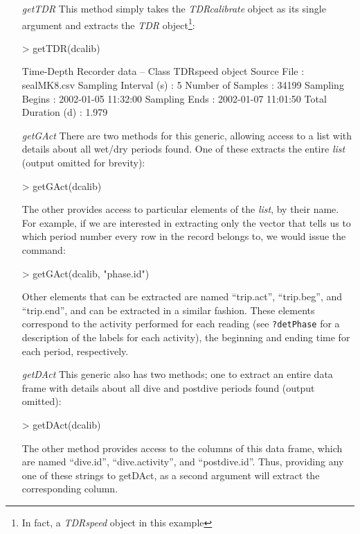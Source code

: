 \documentclass[12pt, letterpaper]{scrartcl}
\newcommand{\Rclass}[1]{{\textit{#1}}}
\newcommand{\Rmethod}[1]{{\textit{#1}}}
\begin{document}
\begin{itemize}
\item [\Rmethod{getTDR}] This method simply takes the
  \Rclass{TDRcalibrate} object as its single argument and extracts the
  \Rclass{TDR} object\footnote{In fact, a \Rclass{TDRspeed} object in this
    example}:
\begin{Schunk}
\begin{Sinput}
> getTDR(dcalib)
\end{Sinput}
\begin{Soutput}
Time-Depth Recorder data -- Class TDRspeed object
  Source File             : sealMK8.csv 
  Sampling Interval (s)   : 5 
  Number of Samples       : 34199 
  Sampling Begins         : 2002-01-05 11:32:00 
  Sampling Ends           : 2002-01-07 11:01:50 
  Total Duration (d)      : 1.979 
\end{Soutput}
\end{Schunk}

\item [\Rmethod{getGAct}] There are two methods for this generic, allowing
  access to a list with details about all wet/dry periods found.  One of
  these extracts the entire \Rclass{list} (output omitted for brevity):
\begin{Schunk}
\begin{Sinput}
> getGAct(dcalib)
\end{Sinput}
\end{Schunk}
The other provides access to particular elements of the \Rclass{list}, by
their name.  For example, if we are interested in extracting only the
vector that tells us to which period number every row in the record
belongs to, we would issue the command:
\begin{Schunk}
\begin{Sinput}
> getGAct(dcalib, "phase.id")
\end{Sinput}
\end{Schunk}
Other elements that can be extracted are named ``trip.act'', ``trip.beg'',
and ``trip.end'', and can be extracted in a similar fashion.  These
elements correspond to the activity performed for each reading (see
\verb|?detPhase| for a description of the labels for each activity), the
beginning and ending time for each period, respectively.

\item [\Rmethod{getDAct}] This generic also has two methods; one to
  extract an entire data frame with details about all dive and postdive
  periods found (output omitted):
\begin{Schunk}
\begin{Sinput}
> getDAct(dcalib)
\end{Sinput}
\end{Schunk}
The other method provides access to the columns of this data frame, which
are named ``dive.id'', ``dive.activity'', and ``postdive.id''.  Thus,
providing any one of these strings to getDAct, as a second argument will
extract the corresponding column.


\end{itemize}
\end{document}
